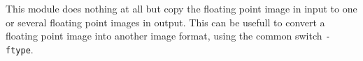 This module does nothing at all but copy the floating point image in input
to one or several floating point images in output.
This can be usefull to convert a floating point image into another image 
format, using the common switch \verb+-ftype+.

